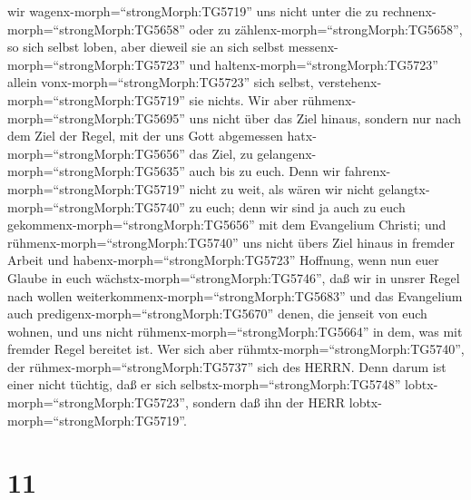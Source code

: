 wir wagenx-morph=``strongMorph:TG5719'' uns nicht unter die zu
rechnenx-morph=``strongMorph:TG5658'' oder zu
zählenx-morph=``strongMorph:TG5658'', so sich selbst loben, aber dieweil
sie an sich selbst messenx-morph=``strongMorph:TG5723'' und
haltenx-morph=``strongMorph:TG5723'' allein
vonx-morph=``strongMorph:TG5723'' sich selbst,
verstehenx-morph=``strongMorph:TG5719'' sie nichts.  Wir
aber rühmenx-morph=``strongMorph:TG5695'' uns nicht über das Ziel
hinaus, sondern nur nach dem Ziel der Regel, mit der uns Gott abgemessen
hatx-morph=``strongMorph:TG5656'' das Ziel, zu
gelangenx-morph=``strongMorph:TG5635'' auch bis zu euch. 
Denn wir fahrenx-morph=``strongMorph:TG5719'' nicht zu weit, als wären
wir nicht gelangtx-morph=``strongMorph:TG5740'' zu euch; denn wir sind
ja auch zu euch gekommenx-morph=``strongMorph:TG5656'' mit dem
Evangelium Christi;  und
rühmenx-morph=``strongMorph:TG5740'' uns nicht übers Ziel hinaus in
fremder Arbeit und habenx-morph=``strongMorph:TG5723'' Hoffnung, wenn
nun euer Glaube in euch wächstx-morph=``strongMorph:TG5746'', daß wir in
unsrer Regel nach wollen weiterkommenx-morph=``strongMorph:TG5683''
 und das Evangelium auch
predigenx-morph=``strongMorph:TG5670'' denen, die jenseit von euch
wohnen, und uns nicht rühmenx-morph=``strongMorph:TG5664'' in dem, was
mit fremder Regel bereitet ist.  Wer sich aber
rühmtx-morph=``strongMorph:TG5740'', der
rühmex-morph=``strongMorph:TG5737'' sich des HERRN.  Denn
darum ist einer nicht tüchtig, daß er sich
selbstx-morph=``strongMorph:TG5748'' lobtx-morph=``strongMorph:TG5723'',
sondern daß ihn der HERR lobtx-morph=``strongMorph:TG5719''.

\hypertarget{section-10}{%
\section{11}\label{section-10}}

